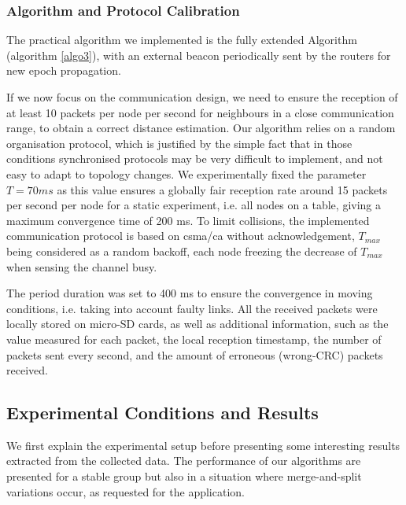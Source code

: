 \documentclass{sig-alternate}
\begin{document}
\subsubsection{Algorithm and Protocol Calibration}
\label{sec:prot_calib}
The practical algorithm we implemented is the fully extended {\mgmc} Algorithm (algorithm \ref{algo3}), with an external beacon periodically sent by the {\lion} routers for new epoch propagation.

If we now focus on the communication design, we need to ensure the reception of at least 10 packets per node per second for neighbours in a close communication range, to obtain a correct distance estimation.
Our algorithm relies on a random organisation protocol, which is justified by the simple fact that in those conditions synchronised protocols may be very difficult to implement, and not easy to adapt to topology changes. We experimentally fixed the parameter $T=70ms$ as this value ensures a globally fair reception rate around 15 packets per second per node for a static experiment, i.e. all nodes on a table, giving a maximum  convergence time of 200 ms. To limit collisions, the implemented communication protocol is based on {\sc csma/ca} without acknowledgement, $T_{max}$ being considered as a random backoff, each node freezing the decrease of $T_{max}$ when sensing the channel busy.

The period duration was set to 400 ms to ensure the convergence in moving conditions, i.e. taking into account faulty links.
All the received packets were locally stored on micro-SD cards, as well as additional information, such as the {\ed} value measured for each packet, the local reception timestamp, the number of packets sent every second, and the amount of erroneous (wrong-CRC) packets received.


\subsection{Experimental Conditions and Results}
\label{sec-results}
We first explain the experimental setup before presenting some interesting results extracted from the collected data. The performance of our algorithms are presented for a stable group but also in a situation where merge-and-split variations occur, as requested for the application.
\end{document}
